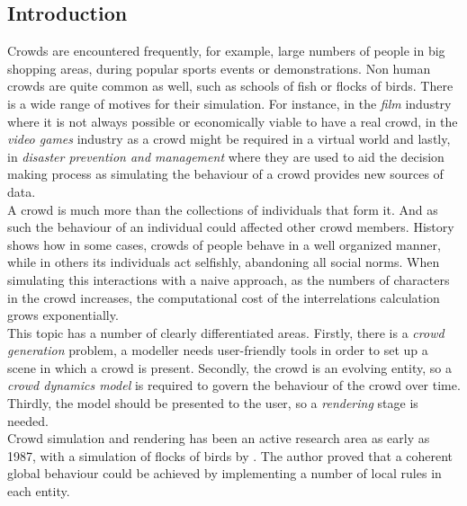 \documentclass[6pt]{article} %
\begin{document}
\setcounter{page}{1} %
\columnsep 25.0pt %
\begin{multicols}{2} %

\section{Introduction}
\label{intro}

Crowds are encountered frequently, for example, large numbers of people in big shopping areas, during popular sports events or demonstrations.
Non human crowds are quite common as well, such as schools of fish or flocks of birds.
There is a wide range of motives for their simulation.
For instance, in the \textit{film} industry where it is not always possible or economically viable to have a real crowd, in the \textit{video games} industry as a crowd might be required in a virtual world and lastly, in \textit{disaster prevention and management} where they are used to aid the decision making process as simulating the behaviour of a crowd provides new sources of data.\\

A crowd is much more than the collections of individuals that form it.
And as such the behaviour of an individual could affected other crowd members.
History shows how in some cases, crowds of people behave in a well organized manner, while in others its individuals act selfishly, abandoning all social norms.
When simulating this interactions with a naive approach, as the numbers of characters in the crowd increases, the computational cost of the interrelations calculation grows exponentially.\\

This topic has a number of clearly differentiated areas.
Firstly, there is a \textit{crowd generation} problem, a modeller needs user-friendly tools in order to set up a scene in which a crowd is present.
Secondly, the crowd is an evolving entity, so a \textit{crowd dynamics model} is required to govern the behaviour of the crowd over time.
Thirdly, the model should be presented to the user, so a \textit{rendering} stage is needed.\\

Crowd simulation and rendering has been an active research area as early as 1987, with a simulation of flocks of birds by \cite{Reynolds1987}.
The author proved that a coherent global behaviour could be achieved by implementing a number of local rules in each entity.


\end{multicols}
\end{document}
